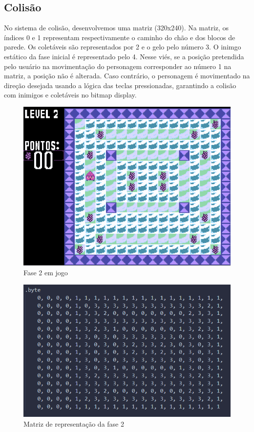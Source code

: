 \documentclass[a4paper]{sbgames}
\begin{document}
\subsection{Colisão}{
\label{sec:colid}

No sistema de colisão, desenvolvemos uma
matriz (320x240). Na matriz, os índices 0 e 1 representam respectivamente o caminho do chão e dos blocos de parede. Os coletáveis são representados por 2 e o gelo pelo número 3. O inimgo estático da fase inicial é representado pelo 4.
Nesse viés, se a posição pretendida pelo usuário
na movimentação do personagem
corresponder ao número 1 na matriz, a
posição não é alterada. Caso contrário, o personagem é movimentado na direção desejada usando a lógica das
teclas pressionadas, garantindo a colisão com inimigos e coletáveis no bitmap display. 
}

\begin{figure}[H]
  \begin{center}
   \includegraphics[width=1.0\linewidth]{./Figures/fase2.PNG}
  \end{center}
  \caption{Fase 2 em jogo}
  \label{fig:04}
\end{figure}

\begin{figure}[H]
  \begin{center}
   \includegraphics[width=1.0\linewidth]{./Figures/matrizlevel2.PNG}
  \end{center}
  \caption{Matriz de representação da fase 2}
  \label{fig:05}
\end{figure}
\end{document}
